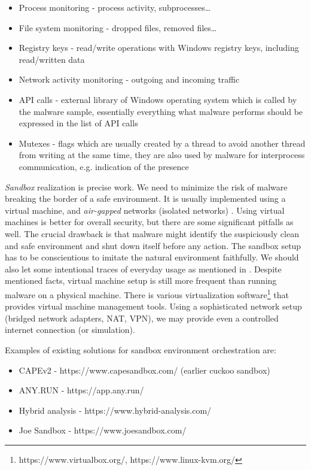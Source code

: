 \begin{itemize}
  \itemsep0em 
  \item Process monitoring - process activity, subprocesses\dots
  \item File system monitoring - dropped files, removed files\dots
  \item Registry keys - read/write operations with Windows registry keys, including read/written data
  \item Network activity monitoring - outgoing and incoming traffic
  \item API calls - external library of Windows operating system which is called by the malware sample, essentially everything what malware performs should be expressed in the list of API calls
  \item Mutexes - flags which are usually created by a thread to avoid another thread from writing at the same time, they are also used by malware for interprocess communication, e.g. indication of the presence
\end{itemize}

\emph{Sandbox} realization is precise work. We need to minimize the risk of malware breaking the border of a safe environment. It is usually implemented using a virtual machine, and \emph{air-gapped} networks (isolated networks) \cite{Sikorski2012}. Using virtual machines is better for overall security, but there are some significant pitfalls as well. The crucial drawback is that malware might identify the suspiciously clean and safe environment and shut down itself before any action. The sandbox setup has to be conscientious to imitate the natural environment faithfully. We should also let some intentional traces of everyday usage as mentioned in \cite{CAPESand75:online}. Despite mentioned facts, virtual machine setup is still more frequent than running malware on a physical machine. There is various virtualization software\footnote{https://www.virtualbox.org/, https://www.linux-kvm.org/} that provides virtual machine management tools. Using a sophisticated network setup (bridged network adapters, NAT, VPN), we may provide even a controlled internet connection (or simulation).

Examples of existing solutions for sandbox environment orchestration are:
\begin{itemize}
  \itemsep0em 
  \item CAPEv2 - https://www.capesandbox.com/ (earlier cuckoo sandbox)
  \item ANY.RUN - https://app.any.run/
  \item Hybrid analysis - https://www.hybrid-analysis.com/
  \item Joe Sandbox - https://www.joesandbox.com/
\end{itemize}

